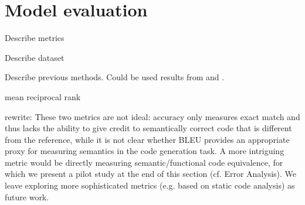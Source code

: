 \chapter{Model evaluation} 
\label{Chapter5} 

Describe metrics

Describe dataset

Describe previous methods. Could be used results from \cite{Yin2017} and \cite{Barone2017}.

mean reciprocal rank

rewrite: These two metrics are not ideal: accuracy only measures exact match and thus lacks the ability to give credit to semantically correct code that is different from the reference, while it is not clear whether BLEU provides an appropriate proxy for measuring semantics in the code generation task. A more
intriguing metric would be directly measuring semantic/functional code equivalence, for which we present a pilot study
at the end of this section (cf. Error Analysis). We leave exploring more sophisticated metrics (e.g. based on static code
analysis) as future work.